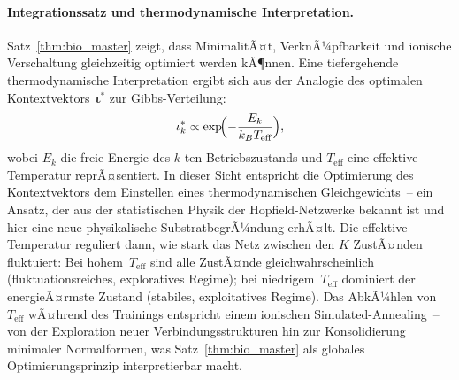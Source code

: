 ﻿\documentclass[12pt, a4paper, openany]{report}
\begin{document}
\paragraph{Integrationssatz und thermodynamische Interpretation.}
Satz~\ref{thm:bio_master} zeigt, dass MinimalitÃ¤t, VerknÃ¼pfbarkeit und
ionische Verschaltung gleichzeitig optimiert werden kÃ¶nnen.  Eine
tiefergehende thermodynamische Interpretation ergibt sich aus der Analogie
des optimalen Kontextvektors~$\bm{\iota}^*$ zur Gibbs-Verteilung:
\[
  \iota_k^* \propto \exp\!\Bigl(-\frac{E_k}{k_B T_{\text{eff}}}\Bigr),
\]
wobei $E_k$ die freie Energie des $k$-ten Betriebszustands und
$T_{\text{eff}}$ eine effektive Temperatur reprÃ¤sentiert.  In dieser Sicht
entspricht die Optimierung des Kontextvektors dem Einstellen eines
thermodynamischen Gleichgewichts~-- ein Ansatz, der aus der statistischen
Physik der Hopfield-Netzwerke \cite{goodfellow16} bekannt ist und
hier eine neue physikalische SubstratbegrÃ¼ndung erhÃ¤lt.
Die effektive Temperatur reguliert dann, wie stark das Netz zwischen den
$K$ ZustÃ¤nden fluktuiert: Bei hohem~$T_{\text{eff}}$ sind alle ZustÃ¤nde
gleichwahrscheinlich (fluktuationsreiches, exploratives Regime); bei
niedrigem~$T_{\text{eff}}$ dominiert der energieÃ¤rmste Zustand (stabiles,
exploitatives Regime).  Das AbkÃ¼hlen von~$T_{\text{eff}}$ wÃ¤hrend des
Trainings entspricht einem ionischen Simulated-Annealing~-- von der Exploration
neuer Verbindungsstrukturen hin zur Konsolidierung minimaler Normalformen, was
Satz~\ref{thm:bio_master} als globales Optimierungsprinzip interpretierbar macht.
\end{document}
